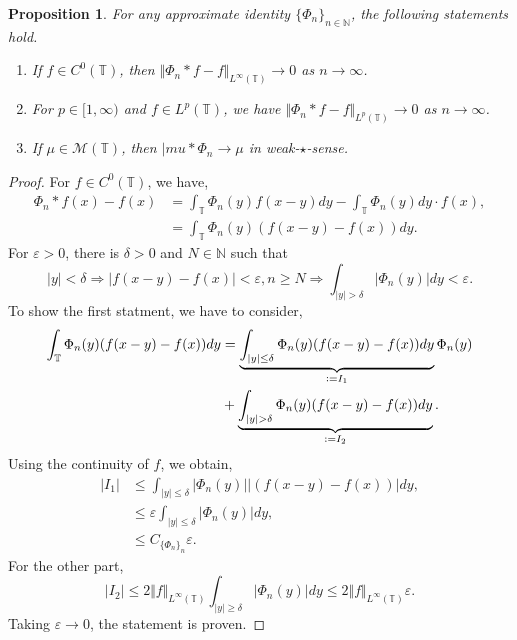 \documentclass[8pt]{article}
\newtheorem{proposition}{Proposition}[section]
\newcommand{\norm}[1]{\Vert #1 \Vert}
\newcommand{\ab}[1]{\vert #1 \vert}
\newcommand{\defeq}{\vcentcolon=}
\newcommand{\bN}[0]{\mathbb{N}}
\newcommand{\bT}[0]{\mathbb{T}}
\newcommand{\cM}[0]{\mathcal{M}}
\begin{document}
\begin{proposition}
  For any approximate identity $\{\Phi_n\}_{n\in\bN}$, the following statements hold.
  \begin{enumerate}[1. ]
    \item If $f\in C^0(\bT)$, then $\norm{\Phi_n\ast f-f}_{L^\infty(\bT)}\to 0$ as $n\to\infty$.
    \item For $p\in[1,\infty)$ and $f\in L^p(\bT)$, we have $\norm{\Phi_n\ast f-f}_{L^p(\bT)}\to 0$ as $n\to\infty$.
    \item If $\mu\in\cM(\bT)$, then $|mu\ast\Phi_n\to \mu$ in weak-$\star$-sense. 
  \end{enumerate}
  \label{proposition_2_9}
\end{proposition}
\begin{proof}
  For $f\in C^0(\bT)$, we have,
  \begin{align*}
    \Phi_n\ast f(x) - f(x) & = \int_\bT\Phi_n(y)f(x-y)dy - \int_\bT\Phi_n(y)dy\cdot f(x),\\
    & = \int_\bT\Phi_n(y)(f(x-y)-f(x))dy.
  \end{align*}
  For $\varepsilon>0$, there is $\delta>0$ and $N\in\bN$ such that 
  \begin{equation*}
    \ab{y}<\delta\Rightarrow \ab{f(x-y)-f(x)}<\varepsilon, n\geq N\Rightarrow\int_{\ab{y}>\delta}\ab{\Phi_n(y)}dy<\varepsilon.
  \end{equation*}
  To show the first statment, we have to consider,
  \begin{align*}
     \int_\bT\Phi_n(y)(f(x-y)-f(x))dy & = \underbrace{\int_{\ab{y}\leq \delta}\Phi_n(y)(f(x-y)-f(x))dy}_{\defeq I_1}\Phi_n(y)\\
     &+\underbrace{\int_{\ab{y}> \delta}\Phi_n(y)(f(x-y)-f(x))dy}_{\defeq I_2}.
  \end{align*}
  Using the continuity of $f$, we obtain,
  \begin{align*}
    \ab{I_1} & \leq \int_{\ab{y}\leq \delta}\ab{\Phi_n(y)}\ab{(f(x-y)-f(x))}dy,\\
    & \leq \varepsilon\int_{\ab{y}\leq \delta}\ab{\Phi_n(y)}dy,\\
    & \leq C_{\{\Phi_n\}_n}\varepsilon.
  \end{align*}
  For the other part,
  \begin{equation*}
    \ab{I_2}\leq 2\norm{f}_{L^\infty(\bT)}\int_{\ab{y}\geq\delta}\ab{\Phi_n(y)}dy\leq  2\norm{f}_{L^\infty(\bT)}\varepsilon.
  \end{equation*}
  Taking $\varepsilon\to0$, the statement is proven.

\end{proof}
\end{document}
